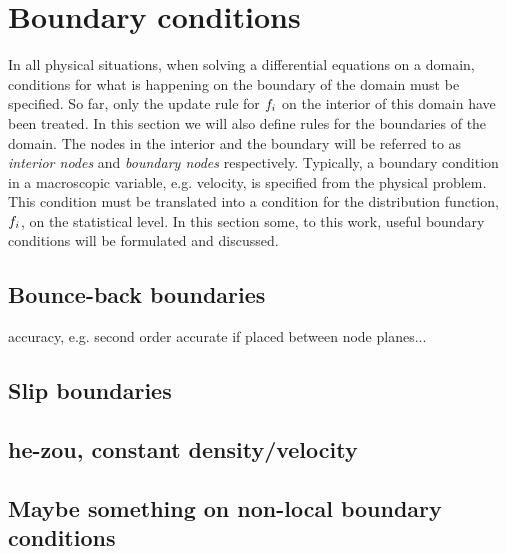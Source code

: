 \section{Boundary conditions}\label{sec:lbm:bound}
In all physical situations, when solving a differential equations on a
domain, conditions for what is happening on the boundary of the domain
must be specified. So far, only the update rule for $f_i$ on the
interior of this domain have been treated. In this section we will
also define rules for the boundaries of the domain. The nodes in the
interior and the boundary will be referred to as \emph{interior nodes}
and \emph{boundary nodes} respectively. Typically, a boundary
condition in a macroscopic variable, e.g. velocity, is specified from
the physical problem. This condition must be translated into a
condition for the distribution function, $f_i$, on the statistical
level. In this section some, to this work, useful boundary conditions
will be formulated and discussed.

\subsection{Bounce-back boundaries}\label{sex:lbm:bb}
accuracy, e.g. second order accurate if placed between node planes...

\subsection{Slip boundaries}

\subsection{he-zou, constant density/velocity}

\subsection{Maybe something on non-local boundary conditions}
